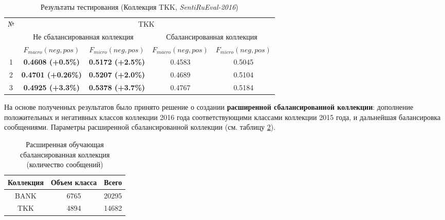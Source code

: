 \begin{table}[ht!]
\centering
\caption{Результаты тестирования (Коллекция TKK, {\it SentiRuEval-2016})}
\label{table:tkkResult2015}
\begin{tabular}{|c|c|c|c|c|}
\hline
\multirow{3}{*}{№} & \multicolumn{4}{c|}{TKK}                                                                             \\ \cline{2-5}
                   & \multicolumn{2}{c|}{Не сбалансированная коллекция} & \multicolumn{2}{c|}{Сбалансированная коллекция} \\ \cline{2-5}
                   & $F_{macro}(neg, pos)$    & $F_{micro}(neg, pos)$   & $F_{macro}(neg, pos)$  & $F_{micro}(neg, pos)$  \\ \hline
1                  & {\bf 0.4608 (+0.5\%)}          & {\bf 0.5172 (+2.5\%)}          & 0.4583                 & 0.5045                 \\ \hline
2                  & {\bf 0.4701 (+0.26\%)}         & {\bf 0.5207 (+2.0\%)}          & 0.4689                 & 0.5104                 \\ \hline
3                  & {\bf 0.4925 (+3.3\%) }         & {\bf 0.5378 (+3.7\%)}          & 0.4767                 & 0.5184                 \\ \hline
\end{tabular}
\end{table}

%
%
На основе полученных результатов было принято решение о создании {\bf расширенной
сбалансированной коллекции}: дополнение положительных и негативных классов
коллекции 2016 года соответствующими классами коллекции 2015 года, и дальнейшая
балансировка сообщениями.
Параметры расширенной сбалансированной коллекции (см. таблицу
\ref{table:extendedCollection}).

\begin{table}[ht!]
\centering
\caption{Расширенная обучающая сбалансированная коллекция (количество сообщений)}
\label{table:extendedCollection}
\begin{tabular}{|c|c|c|}
\hline
Коллекция & Объем класса & Всего \\ \hline
BANK      & 6765         & 20295 \\ \hline
TKK       & 4894         & 14682 \\ \hline
\end{tabular}
\end{table}
